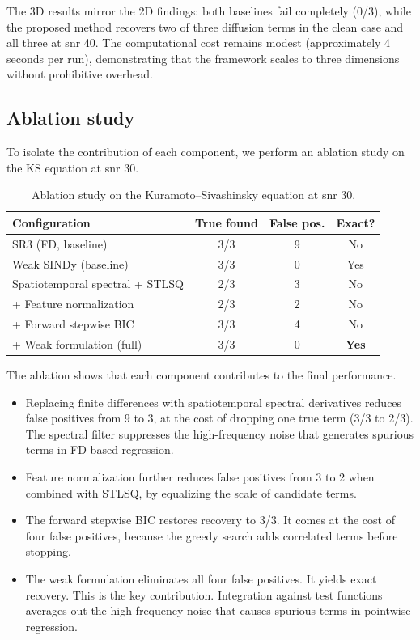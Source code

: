 \documentclass[preprint,12pt]{elsarticle}
\begin{document}
The 3D results mirror the 2D findings: both baselines fail completely (0/3), while the proposed method recovers two of three diffusion terms in the clean case and all three at snr 40. The computational cost remains modest (approximately 4 seconds per run), demonstrating that the framework scales to three dimensions without prohibitive overhead.

\subsection{Ablation study}
\label{sec:ablation}

To isolate the contribution of each component, we perform an ablation study on the KS equation at snr 30.

\begin{table}[H]
\centering
\caption{Ablation study on the Kuramoto--Sivashinsky equation at snr 30.}
\label{tab:ablation}
\begin{tabular}{lccc}
\toprule
Configuration & True found & False pos. & Exact? \\
\midrule
SR3 (FD, baseline) & 3/3 & 9 & No \\
Weak SINDy (baseline) & 3/3 & 0 & Yes \\
Spatiotemporal spectral + STLSQ & 2/3 & 3 & No \\
+ Feature normalization & 2/3 & 2 & No \\
+ Forward stepwise BIC & 3/3 & 4 & No \\
+ Weak formulation (full) & 3/3 & 0 & \textbf{Yes} \\
\bottomrule
\end{tabular}
\end{table}

The ablation shows that each component contributes to the final performance.
\begin{itemize}
\item Replacing finite differences with spatiotemporal spectral derivatives reduces false positives from 9 to 3, at the cost of dropping one true term (3/3 to 2/3). The spectral filter suppresses the high-frequency noise that generates spurious terms in FD-based regression.
\item Feature normalization further reduces false positives from 3 to 2 when combined with STLSQ, by equalizing the scale of candidate terms.
\item The forward stepwise BIC restores recovery to 3/3. It comes at the cost of four false positives, because the greedy search adds correlated terms before stopping.
\item The weak formulation eliminates all four false positives. It yields exact recovery. This is the key contribution. Integration against test functions averages out the high-frequency noise that causes spurious terms in pointwise regression.
\end{itemize}
\end{document}

